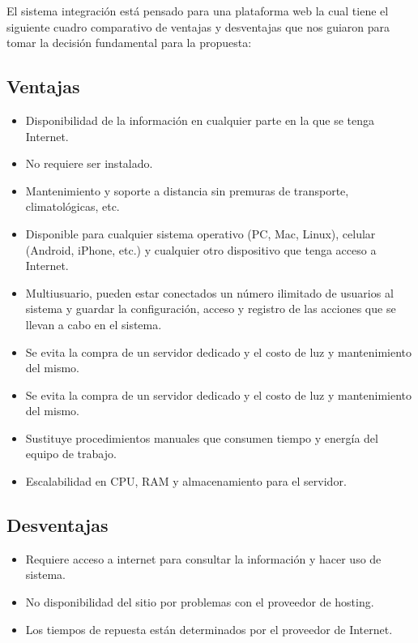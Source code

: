 \documentclass[12pt,letterpaper]{article}
\begin{document}
El sistema integración está pensado para una plataforma web la cual tiene el siguiente cuadro comparativo de ventajas y desventajas que nos guiaron para tomar la decisión fundamental para la propuesta:

\subsection*{Ventajas}

    \begin{itemize}
        \item Disponibilidad de la información en cualquier parte en la que se tenga Internet.
        \item No requiere ser instalado.
        \item Mantenimiento y soporte a distancia sin premuras de transporte, climatológicas, etc.
        \item Disponible para cualquier sistema operativo (PC, Mac, Linux), celular (Android, iPhone, etc.) y cualquier otro dispositivo que tenga acceso a Internet.
        \item Multiusuario, pueden estar conectados un número ilimitado de usuarios al sistema y guardar la configuración, acceso y registro de las acciones que se llevan a cabo en el sistema.
        \item Se evita la compra de un servidor dedicado y el costo de luz y mantenimiento del mismo.
        \item Se evita la compra de un servidor dedicado y el costo de luz y mantenimiento del mismo.
        \item Sustituye procedimientos manuales que consumen tiempo y energía del equipo de trabajo.
        \item Escalabilidad en CPU, RAM y almacenamiento para el servidor.
    \end{itemize}


\subsection*{Desventajas}
    \begin{itemize}
        \item Requiere acceso a internet para consultar la información y hacer uso de sistema.
        \item No disponibilidad del sitio por problemas con el proveedor de hosting.
        \item Los tiempos de repuesta están determinados por el proveedor de Internet.
    \end{itemize}
\end{document}
